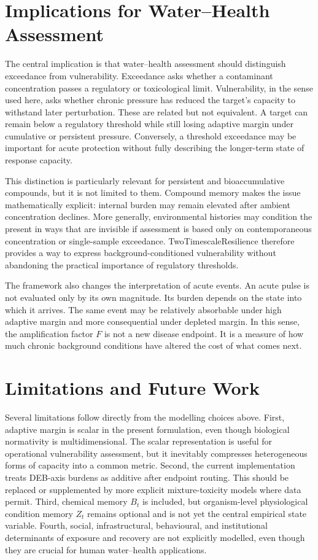 \section{Implications for Water--Health Assessment}
\label{sec:implications}

The central implication is that water--health assessment should distinguish exceedance from vulnerability. Exceedance asks whether a contaminant concentration passes a regulatory or toxicological limit. Vulnerability, in the sense used here, asks whether chronic pressure has reduced the target's capacity to withstand later perturbation. These are related but not equivalent. A target can remain below a regulatory threshold while still losing adaptive margin under cumulative or persistent pressure. Conversely, a threshold exceedance may be important for acute protection without fully describing the longer-term state of response capacity.

This distinction is particularly relevant for persistent and bioaccumulative compounds, but it is not limited to them. Compound memory makes the issue mathematically explicit: internal burden may remain elevated after ambient concentration declines. More generally, environmental histories may condition the present in ways that are invisible if assessment is based only on contemporaneous concentration or single-sample exceedance. TwoTimescaleResilience therefore provides a way to express background-conditioned vulnerability without abandoning the practical importance of regulatory thresholds.

The framework also changes the interpretation of acute events. An acute pulse is not evaluated only by its own magnitude. Its burden depends on the state into which it arrives. The same event may be relatively absorbable under high adaptive margin and more consequential under depleted margin. In this sense, the amplification factor $F$ is not a new disease endpoint. It is a measure of how much chronic background conditions have altered the cost of what comes next.

\section{Limitations and Future Work}
\label{sec:limitations}

Several limitations follow directly from the modelling choices above. First, adaptive margin is scalar in the present formulation, even though biological normativity is multidimensional. The scalar representation is useful for operational vulnerability assessment, but it inevitably compresses heterogeneous forms of capacity into a common metric. Second, the current implementation treats DEB-axis burdens as additive after endpoint routing. This should be replaced or supplemented by more explicit mixture-toxicity models where data permit. Third, chemical memory $B_t$ is included, but organism-level physiological condition memory $Z_t$ remains optional and is not yet the central empirical state variable. Fourth, social, infrastructural, behavioural, and institutional determinants of exposure and recovery are not explicitly modelled, even though they are crucial for human water--health applications.

